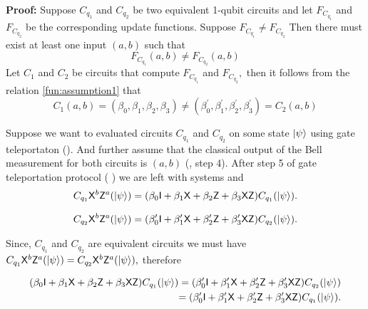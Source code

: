 {\bf Proof:}  Suppose $C_{q_1}$ and $C_{q_2}$ be two equivalent 1-qubit circuits and let $F_{C_{q_1}}$ and $F_{C_{q_2}}$ be the corresponding update functions. Suppose $F_{C_{q_1}}\neq F_{C_{q_2}}$ Then there must exist at least one input $(a,b)$ such that
\begin{equation}
\label{fun:assumption1}
F_{C_{q_1}}(a,b)\neq F_{C_{q_2}}(a,b)
\end{equation}
Let $C_1$ and $C_2$ be circuits that compute $F_{C_{q_1}}$ and $F_{C_{q_2}},$ then it follows from the relation \ref{fun:assumption1} that
\begin{equation*}
C_1(a,b)=(\beta_0, \beta_1, \beta_2 , \beta_3)\neq (\beta_0^\prime, \beta_1^\prime, \beta_2^\prime , \beta_3^\prime)=C_2(a,b)
\end{equation*}

Suppose we want to evaluated circuits $C_{q_1}$ and $C_{q_2}$ on some state ${\lvert}\psi\rangle$ using gate teleportaton (). And further assume that the classical output of the Bell measurement for both circuits is  $(a,b)$ (, step 4). After step 5 of  gate teleportation protocol ( ) we are left with systems  and 
\begin{equation}
\label{lemma:1qubit:eq1}
\begin{aligned}
 C_{q_1} {\sf X}^b {\sf Z}^a({\lvert}\psi\rangle)=(\beta_0 {\sf I}+\beta_1 {\sf X}+\beta_2 {\sf Z}+\beta_3 {\sf X} {\sf Z})  C_{q_1} ({\lvert}\psi\rangle).\\
 \end{aligned}
\end{equation}

\begin{equation}
\label{lemma:1qubit:eq2}
\begin{aligned}
 C_{q_2}{\sf X}^b {\sf Z}^a({\lvert}\psi\rangle)=(\beta_0^\prime {\sf I}+\beta_1^\prime {\sf X}+\beta_2^\prime {\sf Z}+\beta_3^\prime {\sf X} {\sf Z})  C_{q_2}({\lvert}\psi\rangle).
 \end{aligned}
\end{equation}

Since, $C_{q_1}$ and $C_{q_2}$ are equivalent circuits we must have $C_{q_1} {\sf X}^b {\sf Z}^a({\lvert}\psi\rangle)=C_{q_2} {\sf X}^b {\sf Z}^a({\lvert}\psi\rangle),$ therefore

\begin{equation}
\label{lemma:1qubit:eq3}
\begin{aligned}
(\beta_0 {\sf I}+\beta_1 {\sf X}+\beta_2 {\sf Z}+\beta_3 {\sf X} {\sf Z})  C_{q_1} ({\lvert}\psi\rangle)=(\beta_0^\prime {\sf I}+\beta_1^\prime {\sf X}+\beta_2^\prime {\sf Z}+\beta_3^\prime {\sf X} {\sf Z})  C_{q_2} ({\lvert}\psi\rangle)\\
=(\beta_0^\prime {\sf I}+\beta_1^\prime {\sf X}+\beta_2^\prime {\sf Z}+\beta_3^\prime {\sf X} {\sf Z})  C_{q_1}({\lvert}\psi\rangle).\\
\end{aligned}
\end{equation}


